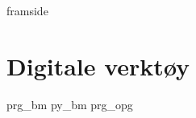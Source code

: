 




\addto\captionsenglish{\renewcommand{\figurename}{Figur}}
\makeatletter
\addto\captionsenglish{\renewcommand{\chaptername}{Kapittel}}
\addto\captionsenglish{\renewcommand{\contentsname}{Innhold}}




{framside}
\newpage
\tableofcontents

\chapter{Digitale verktøy \label{Dig}}
{prg_bm}
{py_bm}
{prg_opg}








